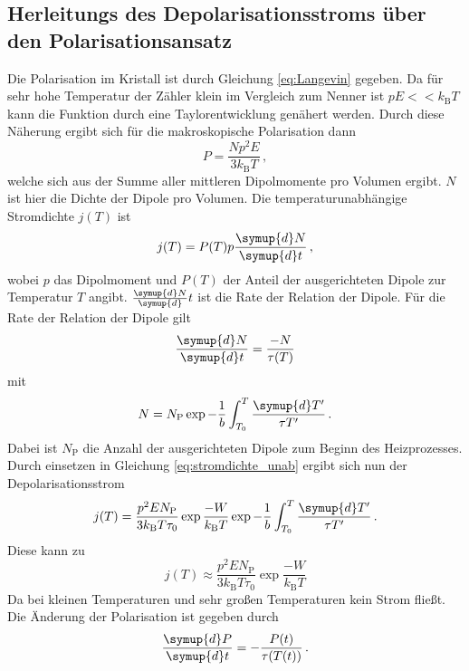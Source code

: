 \subsection{Herleitungs des Depolarisationsstroms über den Polarisationsansatz}
Die Polarisation im Kristall ist durch Gleichung \eqref{eq:Langevin} gegeben.
Da für sehr hohe Temperatur der Zähler klein im Vergleich zum Nenner ist $pE << k_\text{B} T$ kann die Funktion durch eine Taylorentwicklung genähert werden.
Durch diese Näherung ergibt sich für die makroskopische Polarisation dann
\begin{equation}
    P = \frac{Np^2E}{3 k_\text{B}T} \, ,
    \label{eq:langevin2}
\end{equation}
welche sich aus der Summe aller mittleren Dipolmomente pro Volumen ergibt.
$N$ ist hier die Dichte der Dipole pro Volumen.
Die temperaturunabhängige Stromdichte $j(T)$ ist
\begin{equation}
    j(T) = P(T)p \frac{\symup{d}N}{\symup{d}t} \, ,
    \label{eq:stromdichte_unab}
\end{equation}
wobei $p$ das Dipolmoment und $P(T)$ der Anteil der ausgerichteten Dipole zur Temperatur $T$ angibt.
$\frac{\symup{d}N}{\symup{d}}t$ ist die Rate der Relation der Dipole.
Für die Rate der Relation der Dipole gilt
\begin{equation}
    \frac{\symup{d}N}{\symup{d}t} = \frac{-N}{\tau(T)}
\end{equation}
mit 
\begin{equation}
    N = N_\text{P} \exp{-\frac{1}{b} \int_{T_0}^{T} \frac{\symup{d}T'}{\tau{T'}}} \, .
\end{equation}
Dabei ist $N_\text{P}$ die Anzahl der ausgerichteten Dipole zum Beginn des Heizprozesses.
Durch einsetzen in Gleichung \eqref{eq:stromdichte_unab} ergibt sich nun der Depolarisationsstrom
\begin{equation}
    j(T) = \frac{p^2EN_\text{P}}{3 k_\text{B}T\tau_0} \exp{\frac{-W}{k_\text{B}T}} \exp{-\frac{1}{b} \int_{T_0}^{T} \frac{\symup{d}T'}{\tau{T'}}} \, .
\end{equation}
Diese kann zu 
\begin{equation}
    j(T) \approx  \frac{p^2EN_\text{P}}{3 k_\text{B}T\tau_0} \exp{\frac{-W}{k_\text{B}T}}
\end{equation}
Da bei kleinen Temperaturen und sehr großen Temperaturen kein Strom fließt.
Die Änderung der Polarisation ist gegeben durch
\begin{equation*}
    \frac{\symup{d}P}{\symup{d}t}=-\frac{P(t)}{\tau(T(t))} \, .
\end{equation*}
